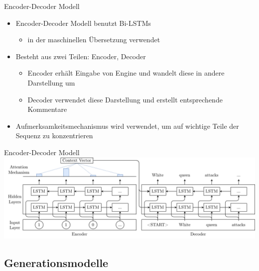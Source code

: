 \begin{frame}{Encoder-Decoder Modell}
\begin{itemize}
	\item Encoder-Decoder Modell benutzt Bi-LSTMs
	\begin{itemize}
		\item in der maschinellen Übersetzung verwendet
	\end{itemize}
	\item Besteht aus zwei Teilen: Encoder, Decoder
	\begin{itemize}
		\item Encoder erhält Eingabe von Engine und wandelt diese in andere Darstellung um
		\item Decoder verwendet diese Darstellung und erstellt entsprechende Kommentare
	\end{itemize}
	\item Aufmerksamkeitsmechanismus wird verwendet, um auf wichtige Teile der Sequenz zu konzentrieren
\end{itemize}
\end{frame}




\begin{frame}{Encoder-Decoder Modell}
\includegraphics[width=1\textwidth]{graphics/commentator_example/general_approach.png}
\end{frame}

\subsection{Generationsmodelle}

